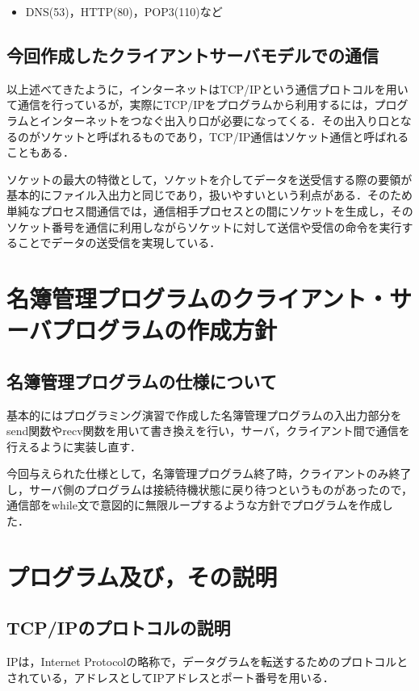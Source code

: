 \documentclass[a4j]{jarticle}
\begin{document}
\begin{itemize}
\item DNS(53)，HTTP(80)，POP3(110)など
\end{itemize}


\subsection{今回作成したクライアントサーバモデルでの通信}
以上述べてきたように，インターネットはTCP/IPという通信プロトコルを用いて通信を行っているが，実際にTCP/IPをプログラムから利用するには，プログラムとインターネットをつなぐ出入り口が必要になってくる．その出入り口となるのがソケットと呼ばれるものであり，TCP/IP通信はソケット通信と呼ばれることもある．

ソケットの最大の特徴として，ソケットを介してデータを送受信する際の要領が基本的にファイル入出力と同じであり，扱いやすいという利点がある．そのため単純なプロセス間通信では，通信相手プロセスとの間にソケットを生成し，そのソケット番号を通信に利用しながらソケットに対して送信や受信の命令を実行することでデータの送受信を実現している．


\section{名簿管理プログラムのクライアント・サーバプログラムの作成方針}

\subsection{名簿管理プログラムの仕様について}
基本的にはプログラミング演習で作成した名簿管理プログラムの入出力部分をsend関数やrecv関数を用いて書き換えを行い，サーバ，クライアント間で通信を行えるように実装し直す．

今回与えられた仕様として，名簿管理プログラム終了時，クライアントのみ終了し，サーバ側のプログラムは接続待機状態に戻り待つというものがあったので，通信部をwhile文で意図的に無限ループするような方針でプログラムを作成した．

\section{プログラム及び，その説明}

\subsection{TCP/IPのプロトコルの説明}

IPは，Internet Protocolの略称で，データグラムを転送するためのプロトコルとされている，アドレスとしてIPアドレスとポート番号を用いる．
\end{document}

